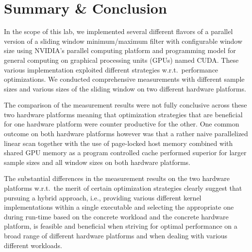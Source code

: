 \section{Summary \& Conclusion}

In the scope of this lab, we implemented several different flavors of a parallel version of a sliding window minimum/maximum filter with configurable window size using NVIDIA’s parallel computing platform and programming  model  for general computing on graphical processing units (GPUs) named  CUDA. These various implementation exploited different strategies w.r.t.\ performance optimizations. We conducted comprehensive measurements with different sample sizes and various sizes of the sliding window on two different hardware platforms.

The comparison of the measurement results were not fully conclusive across these two hardware platforms meaning that optimization strategies that are beneficial for one hardware platform were counter productive for the other. One common outcome on both hardware platforms however was that a rather naive parallelized linear scan together with the use of page-locked host memory combined with shared GPU memory as a program controlled cache performed superior for larger sample sizes and all window sizes on both hardware platforms.

The substantial differences in the measurement results on the two hardware platforms w.r.t.\ the merit of certain optimization strategies clearly suggest that pursuing a hybrid approach, i.e., providing various different kernel implementations within a single executable and selecting the appropriate one during run-time based on the concrete workload and the concrete hardware platform, is feasible and beneficial when striving for optimal performance on a broad range of different hardware platforms and when dealing with various different workloads.
